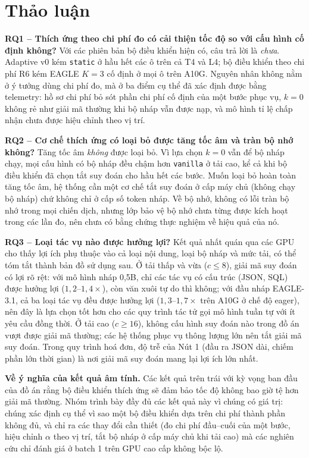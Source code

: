 \section{Thảo luận}
\label{sec:thao-luan}

\textbf{RQ1 -- Thích ứng theo chi phí đo có cải thiện tốc độ so với cấu hình cố định không?} Với các phiên bản bộ điều khiển hiện có, câu trả lời là \emph{chưa}. Adaptive v0 kém \texttt{static} ở hầu hết các ô trên cả T4 và L4; bộ điều khiển theo chi phí R6 kém EAGLE $K=3$ cố định ở mọi ô trên A10G. Nguyên nhân không nằm ở ý tưởng dùng chi phí đo, mà ở ba điểm cụ thể đã xác định được bằng telemetry: hồ sơ chi phí bỏ sót phần chi phí cố định của một bước phục vụ, $k = 0$ không rẻ như giải mã thường khi bộ nháp vẫn được nạp, và mô hình tỉ lệ chấp nhận chưa được hiệu chỉnh theo vị trí.

\textbf{RQ2 -- Cơ chế thích ứng có loại bỏ được tăng tốc âm và tràn bộ nhớ không?} Tăng tốc âm \emph{không} được loại bỏ. Vì lựa chọn $k = 0$ vẫn để bộ nháp chạy, mọi cấu hình có bộ nháp đều chậm hơn \texttt{vanilla} ở tải cao, kể cả khi bộ điều khiển đã chọn tắt suy đoán cho hầu hết các bước. Muốn loại bỏ hoàn toàn tăng tốc âm, hệ thống cần một cơ chế tắt suy đoán ở cấp máy chủ (không chạy bộ nháp) chứ không chỉ ở cấp số token nháp. Về bộ nhớ, không có lỗi tràn bộ nhớ trong mọi chiến dịch, nhưng lớp bảo vệ bộ nhớ chưa từng được kích hoạt trong các lần đo, nên chưa có bằng chứng thực nghiệm về hiệu quả của nó.

\textbf{RQ3 -- Loại tác vụ nào được hưởng lợi?} Kết quả nhất quán qua các GPU cho thấy lợi ích phụ thuộc vào cả loại nội dung, loại bộ nháp và mức tải, có thể tóm tắt thành bản đồ sử dụng sau. Ở tải thấp và vừa ($c \le 8$), giải mã suy đoán có lợi rõ rệt: với mô hình nháp 0,5B, chỉ các tác vụ có cấu trúc (JSON, SQL) được hưởng lợi ($1{,}2$--$1{,}4\times$), còn văn xuôi tự do thì không; với đầu nháp EAGLE-3.1, cả ba loại tác vụ đều được hưởng lợi ($1{,}3$--$1{,}7\times$ trên A10G ở chế độ eager), nên đây là lựa chọn tốt hơn cho các quy trình tác tử gọi mô hình tuần tự với ít yêu cầu đồng thời. Ở tải cao ($c \ge 16$), không cấu hình suy đoán nào trong đồ án vượt được giải mã thường; các hệ thống phục vụ thông lượng lớn nên tắt giải mã suy đoán. Trong quy trình hoá đơn, độ trễ của Nút 1 (đầu ra JSON dài, chiếm phần lớn thời gian) là nơi giải mã suy đoán mang lại lợi ích lớn nhất.

\textbf{Về ý nghĩa của kết quả âm tính.} Các kết quả trên trái với kỳ vọng ban đầu của đồ án rằng bộ điều khiển thích ứng sẽ đảm bảo tốc độ không bao giờ tệ hơn giải mã thường. Nhóm trình bày đầy đủ các kết quả này vì chúng có giá trị: chúng xác định cụ thể vì sao một bộ điều khiển dựa trên chi phí thành phần không đủ, và chỉ ra các thay đổi cần thiết (đo chi phí đầu--cuối của một bước, hiệu chỉnh $\alpha$ theo vị trí, tắt bộ nháp ở cấp máy chủ khi tải cao) mà các nghiên cứu chỉ đánh giá ở batch 1 trên GPU cao cấp không bộc lộ.


